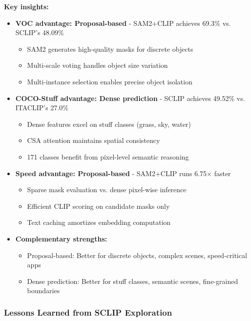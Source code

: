 \textbf{Key insights:}

\begin{itemize}
    \item \textbf{VOC advantage: Proposal-based} - SAM2+CLIP achieves 69.3\% vs. SCLIP's 48.09\%
    \begin{itemize}
        \item SAM2 generates high-quality masks for discrete objects
        \item Multi-scale voting handles object size variation
        \item Multi-instance selection enables precise object isolation
    \end{itemize}

    \item \textbf{COCO-Stuff advantage: Dense prediction} - SCLIP achieves 49.52\% vs. ITACLIP's 27.0\%
    \begin{itemize}
        \item Dense features excel on stuff classes (grass, sky, water)
        \item CSA attention maintains spatial consistency
        \item 171 classes benefit from pixel-level semantic reasoning
    \end{itemize}

    \item \textbf{Speed advantage: Proposal-based} - SAM2+CLIP runs 6.75$\times$ faster
    \begin{itemize}
        \item Sparse mask evaluation vs. dense pixel-wise inference
        \item Efficient CLIP scoring on candidate masks only
        \item Text caching amortizes embedding computation
    \end{itemize}

    \item \textbf{Complementary strengths:}
    \begin{itemize}
        \item Proposal-based: Better for discrete objects, complex scenes, speed-critical apps
        \item Dense prediction: Better for stuff classes, semantic scenes, fine-grained boundaries
    \end{itemize}
\end{itemize}

\subsubsection{Lessons Learned from SCLIP Exploration}

